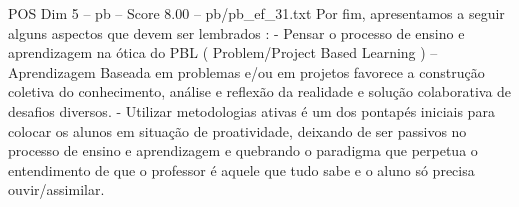 \begin{textsample}{POS Dim 5 – pb – Score 8.00 – pb/pb\_ef\_31.txt}
Por fim, apresentamos a seguir alguns aspectos que devem ser lembrados : - Pensar o processo de ensino e aprendizagem na ótica do PBL ( Problem/Project Based Learning ) – Aprendizagem Baseada em problemas e/ou em projetos favorece a construção coletiva do conhecimento, análise e reflexão da realidade e solução colaborativa de desafios diversos. - Utilizar metodologias ativas é um dos pontapés iniciais para colocar os alunos em situação de proatividade, deixando de ser passivos no processo de ensino e aprendizagem e quebrando o paradigma que perpetua o entendimento de que o professor é aquele que tudo sabe e o aluno só precisa ouvir/assimilar.

\end{textsample}
